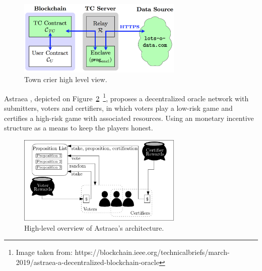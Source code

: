 \begin{figure}[H]
  \begin{center}
    \leavevmode
    \includegraphics[width=0.7\textwidth]{figures/town-crier.png}
    \caption{Town crier high level view.}
    \label{fig:/figures/town-crier}
  \end{center}
\end{figure}





Astraea \citet{Adler2018}, depicted on Figure~\ref{fig:/figures/astraea}~\footnote{Image taken from: https://blockchain.ieee.org/technicalbriefs/march-2019/astraea-a-decentralized-blockchain-oracle}, proposes a decentralized oracle network with submitters, voters and certifiers, in which voters play a low-risk game and certifies a high-risk game with associated resources. Using an monetary incentive structure as a means to keep the players honest.

\begin{figure}[H]
  \begin{center}
    \leavevmode
    \includegraphics[width=0.7\textwidth]{figures/astraea.jpg}
    \caption{High-level overview of Astraea's architecture.}
    \label{fig:/figures/astraea}
  \end{center}
\end{figure}

